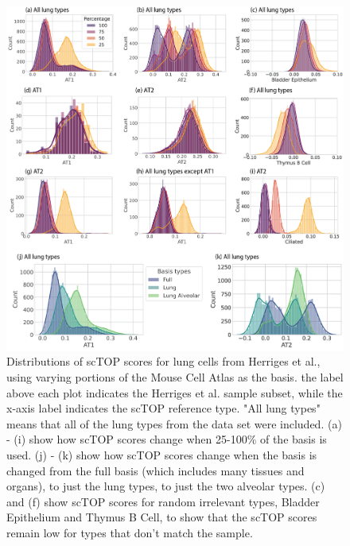 \documentclass[aps,superscriptaddress, notitlepage,longbibliography]{revtex4-1}
\begin{document}
\begin{figure}
	\centering
		\includegraphics[scale=0.82]{figs/robustness hists.png}
	\caption{Distributions of scTOP scores for lung cells from Herriges et al., using varying portions of the Mouse Cell Atlas as the basis. the label above each plot indicates the Herriges et al. sample subset, while the x-axis label indicates the scTOP reference type. "All lung types" means that all of the lung types from the data set were included. (a) - (i) show how scTOP scores change when 25-100\% of the basis is used. (j) - (k) show how scTOP scores change when the basis is changed from the full basis (which includes many tissues and organs), to just the lung types, to just the two alveolar types. (c) and (f) show scTOP scores for random irrelevant types, Bladder Epithelium and Thymus B Cell, to show that the scTOP scores remain low for types that don't match the sample.}
	\label{robustness hists}
\end{figure}


\end{document}
